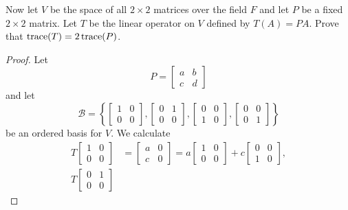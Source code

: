 Now let $V$ be the space of all $2\times2$ matrices over the field $F$
and let $P$ be a fixed $2\times2$ matrix. Let $T$ be the linear
operator on $V$ defined by $T(A) = PA$. Prove that
$\operatorname{trace}(T) = 2\operatorname{trace}(P)$.
\begin{proof}
  Let
  \begin{equation*}
    P =
    \begin{bmatrix}
      a & b \\
      c & d
    \end{bmatrix}
  \end{equation*}
  and let
  \begin{equation*}
    \mathcal{B} = \left\{
      \begin{bmatrix}
        1 & 0 \\
        0 & 0
      \end{bmatrix},
      \begin{bmatrix}
        0 & 1 \\
        0 & 0
      \end{bmatrix},
      \begin{bmatrix}
        0 & 0 \\
        1 & 0
      \end{bmatrix},
      \begin{bmatrix}
        0 & 0 \\
        0 & 1
      \end{bmatrix}
    \right\}
  \end{equation*}
  be an ordered basis for $V$. We calculate
  \begin{align*}
    T
    \begin{bmatrix}
      1 & 0 \\
      0 & 0
    \end{bmatrix}
    &=
    \begin{bmatrix}
      a & 0 \\
      c & 0
    \end{bmatrix}
    = a
    \begin{bmatrix}
      1 & 0 \\
      0 & 0
    \end{bmatrix}
    + c
    \begin{bmatrix}
      0 & 0 \\
      1 & 0
    \end{bmatrix}, \\
    T
    \begin{bmatrix}
      0 & 1 \\
      0 & 0
    \end{bmatrix}

\end{align*}
\end{proof}
